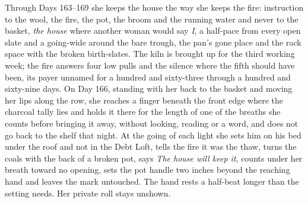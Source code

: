 \documentclass{design/chronicle}
\begin{document}
{Through Days 163–169 she keeps the house the way she keeps the fire: instruction to the wool, the fire, the pot, the broom and the running water and never to the basket, \emph{the house} where another woman would say \emph{I}, a half-pace from every open slate and a going-wide around the bare trough, the pan’s gone place and the rack space with the broken birth-slates. The kiln is brought up for the third working week; the fire answers four low pulls and the silence where the fifth should have been, its payer unnamed for a hundred and sixty-three through a hundred and sixty-nine days. On Day 166, standing with her back to the basket and moving her lips along the row, she reaches a finger beneath the front edge where the charcoal tally lies and holds it there for the length of one of the breaths she counts before bringing it away, without looking, reading or a word, and does not go back to the shelf that night. At the going of each light she sets him on his bed under the roof and not in the Debt Loft, tells the fire it was the thaw, turns the coals with the back of a broken pot, says \emph{The house will keep it}, counts under her breath toward no opening, sets the pot handle two inches beyond the reaching hand and leaves the mark untouched. The hand rests a half-beat longer than the setting needs. Her private roll stays unshown.

}
\end{document}
